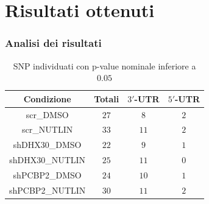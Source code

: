 \documentclass{beamer}
\begin{document}
	\section{Risultati ottenuti}
	\begin{frame}
		\frametitle{Analisi dei risultati}
		\begin{table}[H]
			\begin{tabular}{|c|c|c|c|}
				\hline
				Condizione & Totali & $3'$-UTR & $5'$-UTR\\
				\hline
				scr\_DMSO & $27$ & $8$ & $2$\\
				\hline
				scr\_NUTLIN & $33$ & $11$ &$2$\\
				\hline
				shDHX30\_DMSO & $22$ & $9$ & $1$\\
				\hline
				shDHX30\_NUTLIN & $25$ & $11$ & $0$\\
				\hline
				shPCBP2\_DMSO & $24$ & $10$ & $1$\\
				\hline
				shPCBP2\_NUTLIN & $30$ & $11$ & $2$\\
				\hline
			\end{tabular}
			\caption{SNP individuati con p-value nominale inferiore a $0.05$}
		\end{table}
	\end{frame}
\end{document}
